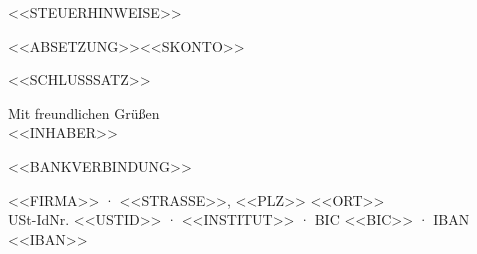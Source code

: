 \documentclass[11pt,a4paper]{article}
\newcommand{\hinweisabsatz}[1]{\par\vspace{6mm}\noindent%
  {\nonfrenchspacing\sfcode`\:=1000 \sfcode`\;=1000 \sfcode`\,=1000 #1}}
\newcommand{\absetzungskopf}[1]{\par\vspace{6mm}\noindent #1\par\vspace{1.5mm}}
\newcommand{\bankblock}{\vspace{9mm}\noindent{\bfseries Bankverbindung}\\[1.5mm]%
  Kontoinhaber: <<KONTOINHABER>>\\
  Institut: <<INSTITUT>>\\
  IBAN: <<IBAN>>\\
  BIC: <<BIC>>}
\begin{document}
\vspace{6mm}

<<STEUERHINWEISE>>

<<ABSETZUNG>><<SKONTO>>

\vspace{5mm}

<<SCHLUSSSATZ>>

\vspace{5mm}

Mit freundlichen Grüßen\\[7mm]
<<INHABER>>

<<BANKVERBINDUNG>>

\vfill

{\centering\scriptsize\color{gedaempft}
<<FIRMA>> · <<STRASSE>>, <<PLZ>> <<ORT>>\\
USt-IdNr. <<USTID>> · <<INSTITUT>> · BIC <<BIC>> · IBAN <<IBAN>>\par}
\end{document}
